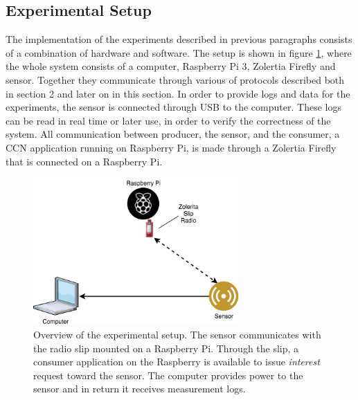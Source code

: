\subsection{Experimental Setup}
The implementation of the experiments described in previous paragraphs consists of a combination of hardware and software. The setup is shown in figure \ref{fig:experiment_setup}, where the whole system consists of a computer, Raspberry Pi 3, Zolertia Firefly and sensor. Together they communicate through various of protocols described both in section 2 and later on in this section. 
In order to provide logs and data for the experiments, the sensor is connected through USB to the computer. These logs can be read in real time or later use, in order to verify the correctness of the system. All communication between producer, the sensor, and the consumer, a CCN application running on Raspberry Pi, is made through a Zolertia Firefly that is connected on a Raspberry Pi.

\begin{figure}\centering
	\includegraphics[width=0.7\textwidth]{figures/experiment_setup.png}
	\caption{Overview of the experimental setup. The sensor communicates with the radio slip mounted on a Raspberry Pi. Through the slip, a consumer application on the Raspberry is available to issue \textit{interest} request toward the sensor. The computer provides power to the sensor and in return it receives measurement logs.}
	\label{fig:experiment_setup}
\end{figure}








